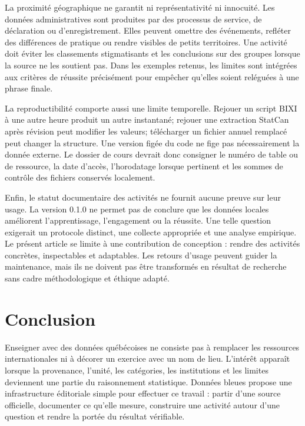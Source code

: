 La proximité géographique ne garantit ni représentativité ni innocuité. Les données administratives sont produites par des processus de service, de déclaration ou d'enregistrement. Elles peuvent omettre des événements, refléter des différences de pratique ou rendre visibles de petits territoires. Une activité doit éviter les classements stigmatisants et les conclusions sur des groupes lorsque la source ne les soutient pas. Dans les exemples retenus, les limites sont intégrées aux critères de réussite précisément pour empêcher qu'elles soient reléguées à une phrase finale.

La reproductibilité comporte aussi une limite temporelle. Rejouer un script BIXI à une autre heure produit un autre instantané; rejouer une extraction StatCan après révision peut modifier les valeurs; télécharger un fichier annuel remplacé peut changer la structure. Une version figée du code ne fige pas nécessairement la donnée externe. Le dossier de cours devrait donc consigner le numéro de table ou de ressource, la date d'accès, l'horodatage lorsque pertinent et les sommes de contrôle des fichiers conservés localement.

Enfin, le statut documentaire des activités ne fournit aucune preuve sur leur usage. La version 0.1.0 ne permet pas de conclure que les données locales améliorent l'apprentissage, l'engagement ou la réussite. Une telle question exigerait un protocole distinct, une collecte appropriée et une analyse empirique. Le présent article se limite à une contribution de conception : rendre des activités concrètes, inspectables et adaptables. Les retours d'usage peuvent guider la maintenance, mais ils ne doivent pas être transformés en résultat de recherche sans cadre méthodologique et éthique adapté.

\section{Conclusion}

Enseigner avec des données québécoises ne consiste pas à remplacer les ressources internationales ni à décorer un exercice avec un nom de lieu. L'intérêt apparaît lorsque la provenance, l'unité, les catégories, les institutions et les limites deviennent une partie du raisonnement statistique. Données bleues propose une infrastructure éditoriale simple pour effectuer ce travail : partir d'une source officielle, documenter ce qu'elle mesure, construire une activité autour d'une question et rendre la portée du résultat vérifiable.

